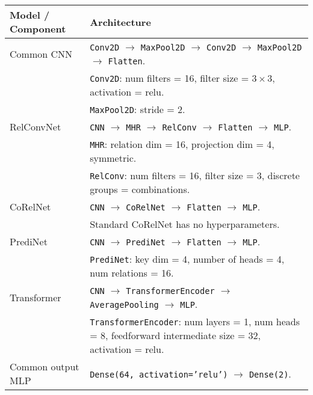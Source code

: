 \begin{tabular}{p{}p{}}
    \toprule
    Model / Component & Architecture                                                                                                                                                                                                                                                                                       \\ \midrule
    Common CNN        & \texttt{Conv2D} $\to$ \texttt{MaxPool2D} $\to$ \texttt{Conv2D} $\to$ \texttt{MaxPool2D} $\to$ \texttt{Flatten}. \\
    & \texttt{Conv2D}: num filters = 16, filter size = $3 \times 3$, activation = relu. \\
    & \texttt{MaxPool2D}: stride = 2. \\\hline
    RelConvNet        & \texttt{CNN} $\to$ \texttt{MHR} $\to$ \texttt{RelConv} $\to$ \texttt{Flatten} $\to$ \texttt{MLP}. \\
    & \texttt{MHR}: relation dim = 16, projection dim = 4, symmetric. \\
    & \texttt{RelConv}: num filters = 16, filter size = 3, discrete groups = combinations. \\\hline
    CoRelNet          & \texttt{CNN} $\to$ \texttt{CoRelNet} $\to$ \texttt{Flatten} $\to$ \texttt{MLP}. \\
    & Standard CoRelNet has no hyperparameters. \\\hline
    PrediNet          & \texttt{CNN} $\to$ \texttt{PrediNet} $\to$ \texttt{Flatten} $\to$ \texttt{MLP}. \\
    & \texttt{PrediNet}: key dim = 4, number of heads = 4, num relations = 16. \\\hline
    Transformer       & \texttt{CNN} $\to$ \texttt{TransformerEncoder} $\to$ \texttt{AveragePooling} $\to$ \texttt{MLP}. \\
    & \texttt{TransformerEncoder}: num layers = 1, num heads = 8, feedforward intermediate size = 32, activation = relu. \\\hline
    Common output MLP & \texttt{Dense(64, activation='relu')} $\to$ \texttt{Dense(2)}.                                                                                                                                                                                                              \\ \bottomrule
\end{tabular}